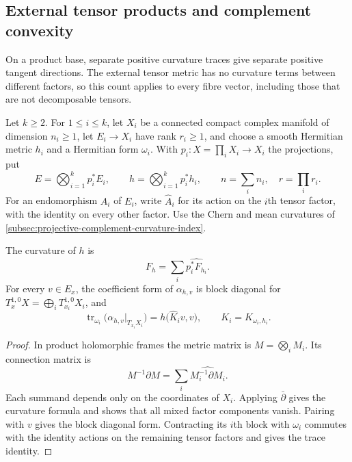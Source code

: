 \subsection{External tensor products and complement convexity}
\label{subsec:external-tensor-complement-curvature}

On a product base, separate positive curvature traces give separate positive tangent directions. The external tensor metric has no curvature terms between different factors, so this count applies to every fibre vector, including those that are not decomposable tensors.

Let $k\geq2$. For $1\leq i\leq k$, let $X_i$ be a connected compact complex manifold of dimension $n_i\geq1$, let $E_i\to X_i$ have rank $r_i\geq1$, and choose a smooth Hermitian metric $h_i$ and a Hermitian form $\omega_i$. With $p_i:X=\prod_iX_i\to X_i$ the projections, put
\[
 E=\bigotimes_{i=1}^kp_i^*E_i,\qquad h=\bigotimes_{i=1}^kp_i^*h_i,
 \qquad n=\sum_i n_i,\quad r=\prod_i r_i.
\]
For an endomorphism $A_i$ of $E_i$, write $\widehat A_i$ for its action on the $i$th tensor factor, with the identity on every other factor. Use the Chern and mean curvatures of \cref{subsec:projective-complement-curvature-index}.

\begin{lemma}\label{lem:external-tensor-curvature-traces}
The curvature of $h$ is
\[
 F_h=\sum_i\widehat{p_i^*F_{h_i}}.
\]
For every $v\in E_x$, the coefficient form of $\alpha_{h,v}$ is block diagonal for $T_x^{1,0}X=\bigoplus_iT_{x_i}^{1,0}X_i$, and
\[
 \operatorname{tr}_{\omega_i}\bigl(\alpha_{h,v}|_{T_{x_i}X_i}\bigr)
 =h\bigl(\widehat K_i v,v\bigr),\qquad K_i=K_{\omega_i,h_i}.
\]
\end{lemma}
\begin{proof}
In product holomorphic frames the metric matrix is $M=\bigotimes_iM_i$. Its connection matrix is
\[
 M^{-1}\partial M=\sum_i\widehat{M_i^{-1}\partial M_i}.
\]
Each summand depends only on the coordinates of $X_i$. Applying $\bar\partial$ gives the curvature formula and shows that all mixed factor components vanish. Pairing with $v$ gives the block diagonal form. Contracting its $i$th block with $\omega_i$ commutes with the identity actions on the remaining tensor factors and gives the trace identity.
\end{proof}

